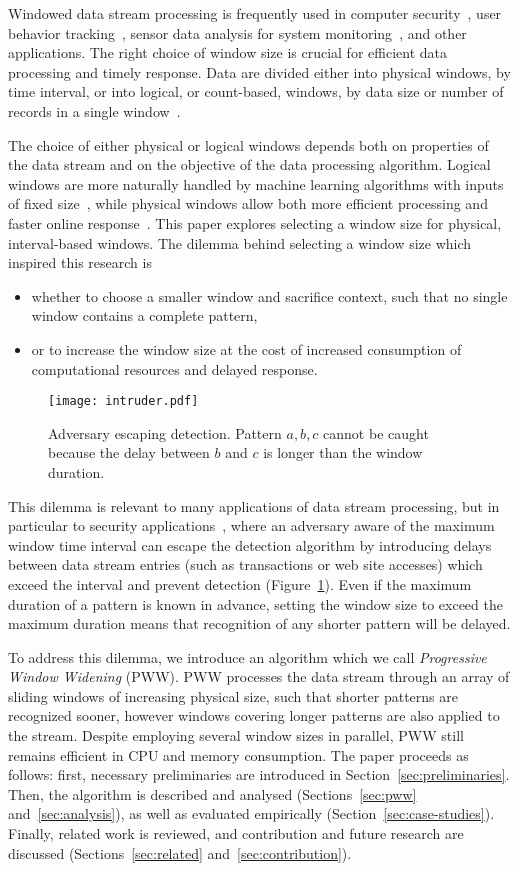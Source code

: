 \documentclass[runningheads,a4paper]{llncs}
\begin{document}
Windowed data stream processing is frequently used in computer
security~\cite{WFP99,VJ07,YDK14}, user behavior
tracking~\cite{ABA+14}, sensor data analysis for system
monitoring~\cite{AFN+07}, and other applications. The right
choice of window size is crucial for efficient data processing
and timely response. Data are divided either into physical
windows, by time interval, or into logical, or count-based,
windows, by data size or number of records in a single
window~\cite{GO03,G12}. 

The choice of either physical or logical
windows depends both on properties of the data stream and on the
objective of the data processing algorithm. Logical
windows are more naturally handled by machine learning
algorithms with inputs of fixed size~\cite{G12}, while
physical windows allow both more efficient
processing and faster online response~\cite{HYZ+10,ZDL+12,ZDL+13}.
This paper explores selecting a window size for
physical, interval-based windows. The dilemma behind selecting
a window size which inspired this research is 
\begin{itemize}
    \item  whether to choose a
smaller window and sacrifice context, such that no single window
contains a complete pattern,
\item or to increase the window size at the cost of increased
    consumption of computational resources and delayed response.
\end{itemize}
\begin{figure}
    \centering
	\texttt{[image: intruder.pdf]}
    \caption{Adversary escaping detection. Pattern $a, b, c$
    cannot be caught because the delay between $b$
    and $c$ is longer than the window duration.}
    \label{fig:intruder}
\end{figure}
This dilemma is relevant to many applications of data stream
processing, but in particular to security
applications~\cite{WFP99,VJ07,YDK14}, where an adversary
aware of the maximum window time interval can escape the
detection algorithm by introducing delays between data stream
entries (such as transactions or web site accesses) which exceed
the interval and prevent detection (Figure~\ref{fig:intruder}).
Even if the maximum duration of a pattern is known in advance,
setting the window size to exceed the maximum duration means
that recognition of any shorter pattern will be delayed.

To address this dilemma, we introduce an algorithm which we call
\textit{Progressive Window Widening} (PWW). PWW processes the
data stream through an array of sliding windows of increasing
physical size, such that shorter patterns are recognized sooner,
however windows covering longer patterns are also applied to the
stream.  Despite employing several window sizes in parallel, PWW
still remains efficient in CPU and memory consumption. The paper
proceeds as follows: first, necessary preliminaries are
introduced in Section~\ref{sec:preliminaries}. Then, the
algorithm is described and analysed (Sections~\ref{sec:pww}
and~\ref{sec:analysis}), as well as evaluated empirically
(Section~\ref{sec:case-studies}).  Finally, related work is
reviewed, and contribution and future research are discussed
(Sections~\ref{sec:related} and~\ref{sec:contribution}).
\end{document}
